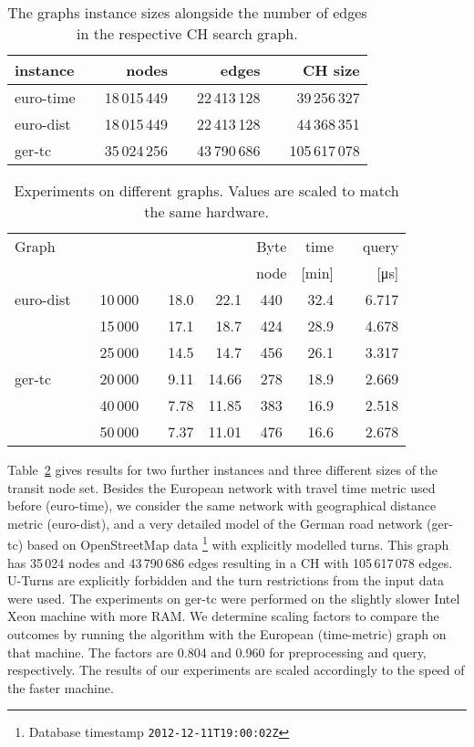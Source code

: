 \documentclass{llncs}
\begin{document}
\begin{table}[b]
\caption{The graphs instance sizes alongside the number of edges in the respective CH search graph.}
\label{tab:graphs}
\centering
\begin{tabular}{lcrcrcr}
\toprule 
 instance & & nodes & & edges & & CH size \\
\midrule
 euro-time 	&  & 18\,015\,449 & & 22\,413\,128 & & 39\,256\,327 \\
 euro-dist 	&  & 18\,015\,449 & & 22\,413\,128 & & 44\,368\,351 \\
 ger-tc 		&  & 35\,024\,256 & & 43\,790\,686 & & 105\,617\,078  \\
\bottomrule 
\end{tabular}
\end{table}


\begin{table}[h]
\caption{Experiments on different graphs. Values are scaled to match the same hardware.}
\label{tab:experimentsGraphs}
\centering
\begin{tabular}{lclcrrcrrr}
\toprule 
Graph 	& 		&  & &  &  & Byte  & time 		 &	& query \\ 
 	& 	& 	&  &  & & node & [\si{\minute}]  &	& [\si{\micro\second}] \\ 
\midrule
euro-dist	& & 10\,000 & & 18.0 & 22.1 & 440 & 32.4 & & 6.717 \\
	 		& & 15\,000 & & 17.1 & 18.7 & 424 & 28.9 & & 4.678 \\
	 		& & 25\,000 & & 14.5 & 14.7 & 456 & 26.1 & & 3.317 \\
\midrule
ger-tc		& & 20\,000 & & 9.11 & 14.66 & 278 & 18.9 & & 2.669 \\
			& & 40\,000 & & 7.78 & 11.85 & 383 & 16.9 & & 2.518 \\
			& & 50\,000 & & 7.37 & 11.01 & 476 & 16.6 & & 2.678 \\
\bottomrule 
\end{tabular}
\end{table}

Table~\ref{tab:experimentsGraphs} gives results for two further instances and three different sizes of the transit node set. Besides the European network with travel time metric used before (euro-time), we consider the same network with geographical distance metric (euro-dist), and a very detailed model of the German road network (ger-tc) based on OpenStreetMap data \footnote{Database timestamp \texttt{2012-12-11T19:00:02Z} } with explicitly modelled turns. 
This graph has 35\,024 nodes and 43\,790\,686 edges resulting in a CH with 105\,617\,078 edges.
U-Turns are explicitly forbidden and the turn restrictions from the input data were used.
The experiments on ger-tc were performed on the slightly slower Intel Xeon machine with more RAM. 
We determine scaling factors to compare the outcomes by running the algorithm with the European (time-metric) graph on that machine. 
The factors are 0.804 and 0.960 for preprocessing and query, respectively. 
The results of our experiments are scaled accordingly to the speed of the faster machine.
\end{document}
